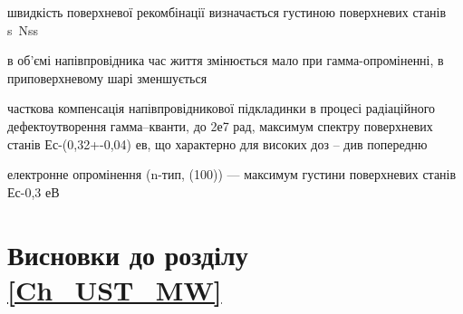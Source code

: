\documentclass[a4paper,14pt,oneside,openany]{memoir}
\begin{document}
швидкість поверхневої рекомбінації визначається густиною поверхневих станів
s~Nss

в об'ємі напівпровідника час життя змінюється мало при гамма-опроміненні, в приповерхневому шарі зменшується

\cite{ParchSiO2}
часткова компенсація напівпровідникової підкладинки в процесі радіаційного дефектоутворення
гамма--кванти, до 2е7 рад, максимум спектру поверхневих станів Ес-(0,32+-0,04) ев, що характерно для високих доз -- див попередню

електронне опромінення (n-тип, (100)) --- максимум густини поверхневих станів Ес-0,3 еВ \cite{LaiSiO2}


\section*{Висновки до розділу \ref{Ch_UST_MW}}
\end{document}
